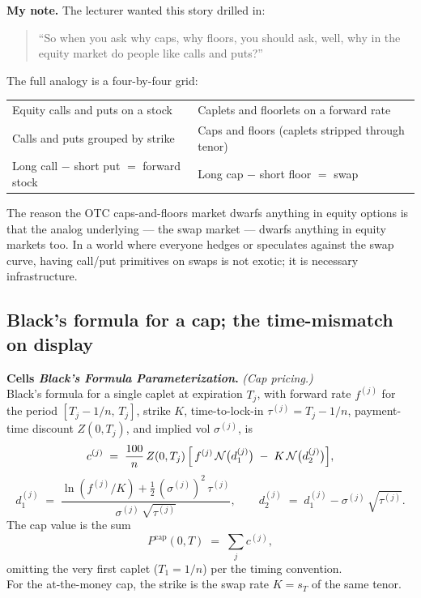 \begin{checkpoint}
\textbf{My note.} The lecturer wanted this story drilled in:
\begin{quote}
``So when you ask why caps, why floors, you should ask, well, why in
the equity market do people like calls and puts?''
\end{quote}
The full analogy is a four-by-four grid:
\begin{center}
\begin{tabular}{ll}
Equity calls and puts on a stock & Caplets and floorlets on a forward rate \\
Calls and puts grouped by strike & Caps and floors (caplets stripped through tenor) \\
Long call $-$ short put $=$ forward stock & Long cap $-$ short floor $=$ swap \\
\end{tabular}
\end{center}
The reason the OTC caps-and-floors market dwarfs anything in equity
options is that the analog underlying --- the swap market --- dwarfs
anything in equity markets too. In a world where everyone hedges or
speculates against the swap curve, having call/put primitives on
swaps is not exotic; it is necessary infrastructure.
\end{checkpoint}

\subsection{Black's formula for a cap; the time-mismatch on display}\label{L6-sec:capformula}

\begin{keyblock}
\textbf{Cells \emph{Black's Formula} \textperiodcentered{}
\emph{Parameterization}.} \emph{(Cap pricing.)}\\
Black's formula for a single caplet at expiration $T_j$, with
forward rate $f^{(j)}$ for the period
$[T_j - 1/n,\, T_j]$, strike $K$, time-to-lock-in
$\tau^{(j)} = T_j - 1/n$, payment-time discount $Z(0, T_j)$, and
implied vol $\sigma^{(j)}$, is
\[
  c^{(j)} \;=\; \frac{100}{n}\,Z(0, T_j)\,
        \Bigl[\, f^{(j)}\,\mathcal{N}\bigl(d_1^{(j)}\bigr)
                 \;-\; K\,\mathcal{N}\bigl(d_2^{(j)}\bigr) \Bigr],
\]
\[
  d_1^{(j)} \;=\; \frac{\ln(f^{(j)} / K) + \tfrac{1}{2}\,(\sigma^{(j)})^2\,\tau^{(j)}}{\sigma^{(j)}\,\sqrt{\tau^{(j)}}},
  \qquad
  d_2^{(j)} \;=\; d_1^{(j)} - \sigma^{(j)}\,\sqrt{\tau^{(j)}}.
\]
The cap value is the sum
\[
  P^{\text{cap}}(0, T) \;=\; \sum_{j} c^{(j)},
\]
omitting the very first caplet ($T_1 = 1/n$) per the timing
convention.\\
For the at-the-money cap, the strike is the swap rate $K = s_T$ of
the same tenor.
\end{keyblock}

